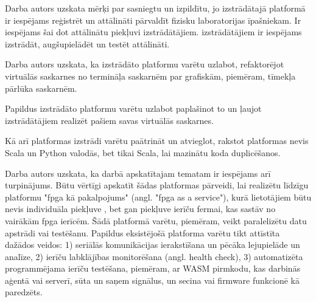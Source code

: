 Darba autors uzskata mērķi par sasniegtu un izpildītu, jo izstrādātajā platformā
ir iespējams reģistrēt un attālināti pārvaldīt fizisku
 laboratorijas īpašniekam. Ir iespējams šai
 dot attālinātu piekļuvi izstrādātājiem.
 izstrādātājiem ir iespējams izstrādāt,
augšupielādēt un testēt  attālināti. 

Darba autors uzskata, ka izstrādāto platformu varētu uzlabot, refaktorējot
virtuālās saskarnes no termināļa saskarnēm par grafiskām, piemēram, tīmekļa
pārlūka saskarnēm.

Papildus izstrādāto platformu varētu uzlabot paplašinot to un ļaujot
izstrādātājiem realizēt pašiem savas virtuālās saskarnes.

Kā arī platformas izstrādi varētu paātrināt un atvieglot, rakstot platformas
 nevis Scala un Python valodās, bet tikai
Scala, lai mazinātu koda duplicēšanos.

Darba autors uzskata, ka darbā apskatītajam tematam ir iespējams arī
turpinājums. Būtu vērtīgi apskatīt šādas platformas pārveidi, lai realizētu
līdzīgu platformu "\gls{fpga} kā pakalpojums" (angl. "\gls{fpga} as a service"),
kurā lietotājiem būtu nevis individuāla piekļuve ,
bet gan piekļuve ierīču fermai, kas sastāv no vairākām \gls{fpga} ierīcēm. Šādā
platformā varētu, piemēram, veikt paralelizētu datu apstrādi vai testēšanu.
Papildus eksistējošā platforma varētu tikt attīstīta dažādos veidos: 1) seriālās
komunikācijas ierakstīšana un pēcāka lejupielāde un analīze, 2) ierīču
labklājības monitorēšana (angl. health check), 3) automatizēta programmējama
ierīču testēšana, piemēram, ar WASM pirmkodu, kas darbinās aģentā vai serverī,
sūta un saņem signālus, un secina vai  \gls{firmware}
funkcionē kā paredzēts.
